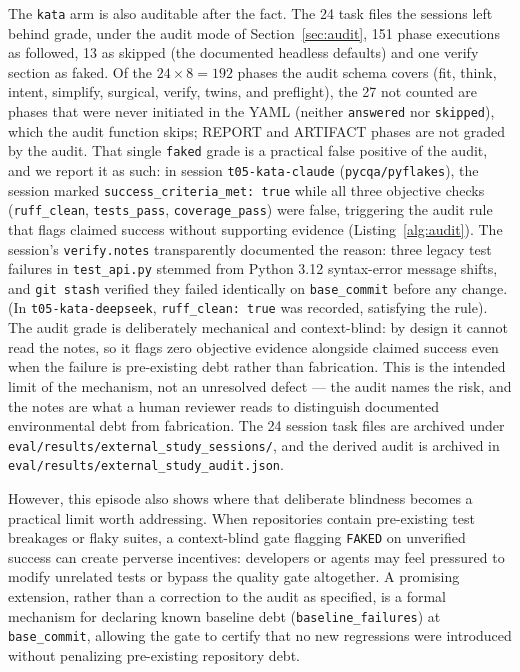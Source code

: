 \documentclass[11pt]{article}
\begin{document}
The \texttt{kata} arm is also auditable after the fact. The 24 task files the
sessions left behind grade, under the audit mode of Section~\ref{sec:audit},
151 phase executions as followed, 13 as skipped (the documented headless
defaults) and one verify section as faked. Of the $24 \times 8 = 192$ phases
the audit schema covers (fit, think, intent, simplify, surgical, verify,
twins, and preflight), the 27 not counted are phases that were never
initiated in the YAML (neither \texttt{answered} nor \texttt{skipped}),
which the audit function skips; REPORT and ARTIFACT phases are not graded
by the audit. That single \texttt{faked} grade
is a practical false positive of the audit, and we report it as such: in
session \texttt{t05-kata-claude}
(\texttt{pycqa/pyflakes}), the session marked \texttt{success\_criteria\_met: true}
while all three objective checks (\texttt{ruff\_clean}, \texttt{tests\_pass},
\texttt{coverage\_pass}) were false, triggering the audit rule that flags
claimed success without supporting evidence (Listing~\ref{alg:audit}). The
session's \texttt{verify.notes} transparently documented the reason: three
legacy test failures in \texttt{test\_api.py} stemmed from Python 3.12
syntax-error message shifts, and \texttt{git stash} verified they failed
identically on \texttt{base\_commit} before any change. (In \texttt{t05-kata-deepseek},
\texttt{ruff\_clean: true} was recorded, satisfying the rule). The audit
grade is deliberately mechanical and context-blind: by design it cannot read
the notes, so it flags zero objective evidence alongside claimed success
even when the failure is pre-existing debt rather than fabrication. This is
the intended limit of the mechanism, not an unresolved defect --- the audit
names the risk, and the notes are what a human reviewer
reads to distinguish documented environmental debt from fabrication. The
24 session task files are archived
under
\texttt{eval/\allowbreak results/\allowbreak external\_study\_sessions/},
and the derived audit is archived in
\texttt{eval/\allowbreak results/\allowbreak external\_study\_audit.json}.

However, this episode also shows where that deliberate blindness becomes a
practical limit worth addressing. When repositories contain
pre-existing test breakages or flaky suites, a context-blind gate flagging
\texttt{FAKED} on unverified success can create perverse incentives: developers
or agents may feel pressured to modify unrelated tests or bypass the quality gate
altogether. A promising extension, rather than a correction to the audit as
specified, is a formal mechanism for declaring
known baseline debt (\texttt{baseline\_failures}) at \texttt{base\_commit},
allowing the gate to certify that no new regressions were introduced without
penalizing pre-existing repository debt.
\end{document}
